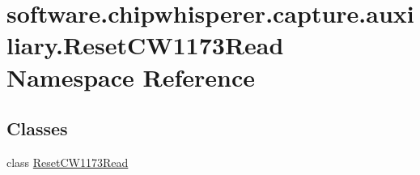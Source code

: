 \hypertarget{namespacesoftware_1_1chipwhisperer_1_1capture_1_1auxiliary_1_1ResetCW1173Read}{}\section{software.\+chipwhisperer.\+capture.\+auxiliary.\+Reset\+C\+W1173\+Read Namespace Reference}
\label{namespacesoftware_1_1chipwhisperer_1_1capture_1_1auxiliary_1_1ResetCW1173Read}
\subsection*{Classes}
\begin{DoxyCompactItemize}
\item 
class \hyperlink{classsoftware_1_1chipwhisperer_1_1capture_1_1auxiliary_1_1ResetCW1173Read_1_1ResetCW1173Read}{Reset\+C\+W1173\+Read}
\end{DoxyCompactItemize}
